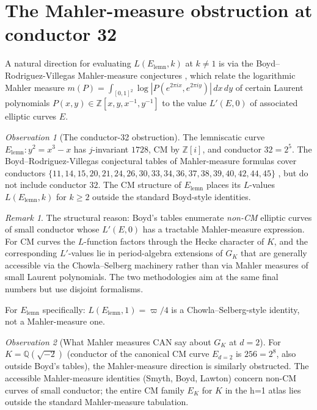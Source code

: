\documentclass[11pt]{amsart}
\theoremstyle{plain}
\theoremstyle{definition}
\theoremstyle{remark}
\newtheorem*{remark}{Remark}
\newtheorem*{observation}{Observation}
\newcommand{\GK}{G_{K}}
\newcommand{\Z}{\mathbb{Z}}
\newcommand{\Q}{\mathbb{Q}}
\begin{document}
\section{The Mahler-measure obstruction at conductor 32}\label{sec:mahler-obstruction}

A natural direction for evaluating $L(E_{\mathrm{lemn}}, k)$ at $k \neq 1$
is via the Boyd--Rodriguez-Villegas Mahler-measure conjectures
\cite{boyd-1998, rodriguez-villegas}, which relate the logarithmic
Mahler measure $m(P) = \int_{[0,1]^{2}} \log|P(e^{2\pi i x}, e^{2\pi i y})|\, dx\, dy$
of certain Laurent polynomials $P(x, y) \in \Z[x, y, x^{-1}, y^{-1}]$ to
the value $L'(E, 0)$ of associated elliptic curves $E$.

\begin{observation}[The conductor-32 obstruction]\label{obs:conductor-32}
The lemniscatic curve $E_{\mathrm{lemn}}: y^{2} = x^{3} - x$ has
$j$-invariant $1728$, CM by $\Z[i]$, and conductor $32 = 2^{5}$. The
Boyd--Rodriguez-Villegas conjectural tables of Mahler-measure formulas
cover conductors
$\{11, 14, 15, 20, 21, 24, 26, 30, 33, 34, 36, 37, 38, 39, 40, 42, 44, 45\}$
\cite{boyd-1998}, but do not include conductor $32$. The CM structure of
$E_{\mathrm{lemn}}$ places its $L$-values $L(E_{\mathrm{lemn}}, k)$ for
$k \geq 2$ outside the standard Boyd-style identities.
\end{observation}

\begin{remark}
The structural reason: Boyd's tables enumerate \emph{non-CM} elliptic
curves of small conductor whose $L'(E, 0)$ has a tractable
Mahler-measure expression. For CM curves the $L$-function factors through
the Hecke character of $K$, and the corresponding $L'$-values lie in
period-algebra extensions of $\GK$ that are generally accessible via the
Chowla--Selberg machinery rather than via Mahler measures of small
Laurent polynomials. The two methodologies aim at the same final
numbers but use disjoint formalisms.

For $E_{\mathrm{lemn}}$ specifically: $L(E_{\mathrm{lemn}}, 1) = \varpi/4$
\cite[\S 11]{paper-gstar-A} is a Chowla--Selberg-style identity, not a
Mahler-measure one.
\end{remark}

\begin{observation}[What Mahler measures CAN say about $\GK$ at $d = 2$]
For $K = \Q(\sqrt{-2})$ (conductor of the canonical CM curve $E_{d=2}$
is $256 = 2^{8}$, also outside Boyd's tables), the Mahler-measure
direction is similarly obstructed. The accessible Mahler-measure
identities (Smyth, Boyd, Lawton) concern non-CM curves of small
conductor; the entire CM family $E_K$ for $K$ in the h=1 atlas lies
outside the standard Mahler-measure tabulation.
\end{observation}
\end{document}
